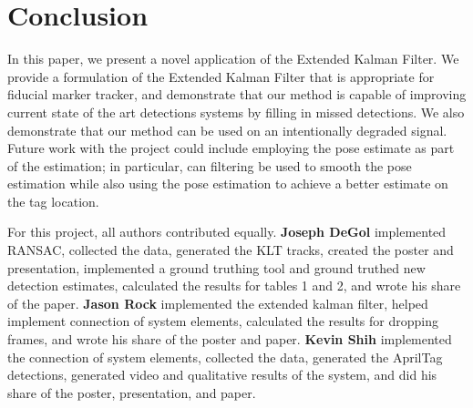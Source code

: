 \documentclass[letterpaper,10pt,conference]{IEEEtran}
\begin{document}
\section{Conclusion}
\label{sec:conclusion}
In this paper, we present a novel application of the Extended Kalman Filter. We provide a formulation of the Extended Kalman Filter that is appropriate for fiducial marker tracker, and demonstrate that our method is capable of improving current state of the art detections systems by filling in missed detections. We also demonstrate that our method can be used on an intentionally degraded signal. Future work with the project could include employing the pose estimate as part of the estimation; in particular, can filtering be used to smooth the pose estimation while also using the pose estimation to achieve a better estimate on the tag location.

For this project, all authors contributed equally.
\textbf{Joseph DeGol} implemented RANSAC, collected the data, generated the KLT tracks, created the poster and presentation, implemented a ground truthing tool and ground truthed new detection estimates, calculated the results for tables 1 and 2, and wrote his share of the paper. \textbf{Jason Rock} implemented the extended kalman filter, helped implement connection of system elements, calculated the results for dropping frames, and wrote his share of the poster and paper. \textbf{Kevin Shih} implemented the connection of system elements, collected the data, generated the AprilTag detections, generated video and qualitative results of the system, and did his share of the poster, presentation, and paper.




\end{document}
